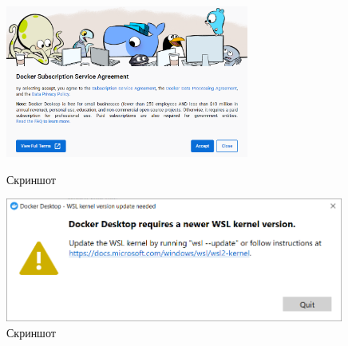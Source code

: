 \begin{figure}[!phtb]
    \centering

    \begin{minipage}{0.49\textwidth}
        \centering

        \includegraphics[height=5cm]
        {images/install/docker/5.png}

        \caption{Скриншот}

        \label{fig:docker_5}
    \end{minipage}
    \begin{minipage}{0.49\textwidth}
        \centering

        \includegraphics[width=0.99\textwidth]
        {images/install/docker/6.png}

        \caption{Скриншот}

        \label{fig:docker_6}
    \end{minipage}
\end{figure}

